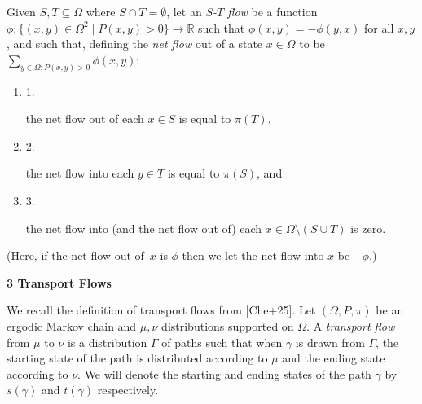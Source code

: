 \documentclass[10pt,a4paper]{article}
\begin{document}
Given $S,T\subseteq\Omega$ where $S\cap T=\emptyset$, let an \emph{$S$-$T$ flow} be a function $\phi:\{(x,y)\in\Omega^{2}\mid P(x,y)>0\}\rightarrow\mathbb{R}$ such that $\phi(x,y)=-\phi(y,x)$ for all $x,y$, and such that, defining the \emph{net flow} out of a state $x\in\Omega$ to be $\sum_{y\in\Omega:P(x,y)>0}\phi(x,y)$:\par


\begin{enumerate}


\item[] 1. 


the net flow out of each $x\in S$ is equal to $\pi(T)$\thinspace{},\par




\item[] 2. 


the net flow into each $y\in T$ is equal to $\pi(S)$\thinspace{}, and\par




\item[] 3. 


the net flow into (and the net flow out of) each $x\in\Omega\setminus\left(S\cup T\right)$ is zero.\par




\end{enumerate}


(Here, if the net flow out of $x$ is $\phi$ then we let the net flow into $x$ be $-\phi$.)\par






\par\medskip\noindent\textbf{3 Transport Flows}\par




We recall the definition of transport flows from [Che+25]. Let $(\Omega,P,\pi)$ be an ergodic Markov chain and $\mu,\nu$ distributions supported on $\Omega$. A \emph{transport flow} from $\mu$ to $\nu$ is a distribution $\Gamma$ of paths such that when $\gamma$ is drawn from $\Gamma$, the starting state of the path is distributed according to $\mu$ and the ending state according to $\nu$. We will denote the starting and ending states of the path $\gamma$ by $s(\gamma)$ and $t(\gamma)$ respectively.\par
\end{document}
